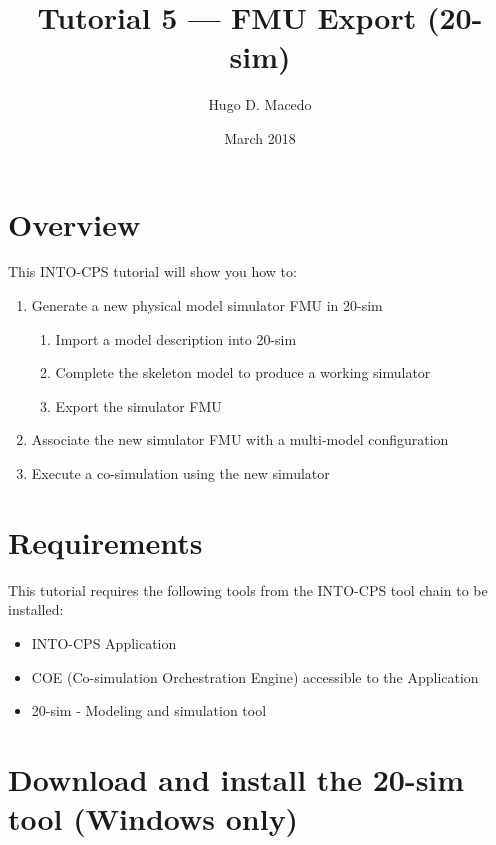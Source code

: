 \documentclass[11pt,a4paper]{../tutorial}
\title{Tutorial 5 --- FMU Export (20-sim)}
\date{March 2018}
\author{Hugo D. Macedo}
\begin{document}
\section*{Overview}

This INTO-CPS tutorial will show you how to:

\begin{enumerate}[noitemsep]
\item Generate a new physical model simulator FMU in 20-sim
    \begin{enumerate}[noitemsep]
        \item Import a model description into 20-sim
        \item Complete the skeleton model to produce a working simulator
        \item Export the simulator FMU
    \end{enumerate}
\item Associate the new simulator FMU with a multi-model configuration
\item Execute a co-simulation using the new simulator
\end{enumerate}

\section*{Requirements}

This tutorial requires the following tools from the INTO-CPS tool chain to be installed:

\begin{itemize}[noitemsep]
\item INTO-CPS Application
\item COE (Co-simulation Orchestration Engine) accessible to the Application
\item 20-sim - Modeling and simulation tool 
\end{itemize}

\section{Download and install the 20-sim tool (Windows only)}
\end{document}
